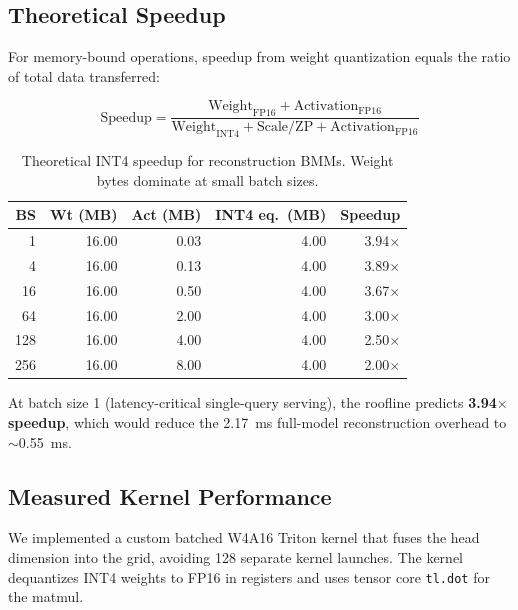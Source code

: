 \documentclass[10pt,twocolumn]{article}
\begin{document}
\subsection{Theoretical Speedup}

For memory-bound operations, speedup from weight quantization equals the ratio of total data transferred:

\begin{equation}
\text{Speedup} = \frac{\text{Weight}_\text{FP16} + \text{Activation}_\text{FP16}}{\text{Weight}_\text{INT4} + \text{Scale/ZP} + \text{Activation}_\text{FP16}}
\label{eq:speedup}
\end{equation}

\begin{table}[h]
\centering
\small
\caption{Theoretical INT4 speedup for reconstruction BMMs.  Weight bytes dominate at small batch sizes.}
\label{tab:int4_speedup}
\begin{tabular}{@{}rrrrr@{}}
\toprule
BS & Wt (MB) & Act (MB) & INT4 eq.\ (MB) & Speedup \\
\midrule
  1 & 16.00 & 0.03 & 4.00 & 3.94$\times$ \\
  4 & 16.00 & 0.13 & 4.00 & 3.89$\times$ \\
 16 & 16.00 & 0.50 & 4.00 & 3.67$\times$ \\
 64 & 16.00 & 2.00 & 4.00 & 3.00$\times$ \\
128 & 16.00 & 4.00 & 4.00 & 2.50$\times$ \\
256 & 16.00 & 8.00 & 4.00 & 2.00$\times$ \\
\bottomrule
\end{tabular}
\end{table}

At batch size 1 (latency-critical single-query serving), the roofline predicts \textbf{3.94$\times$ speedup}, which would reduce the 2.17~ms full-model reconstruction overhead to $\sim$0.55~ms.

\subsection{Measured Kernel Performance}

We implemented a custom batched W4A16 Triton kernel that fuses the head dimension into the grid, avoiding 128 separate kernel launches.  The kernel dequantizes INT4 weights to FP16 in registers and uses tensor core \texttt{tl.dot} for the matmul.
\end{document}

